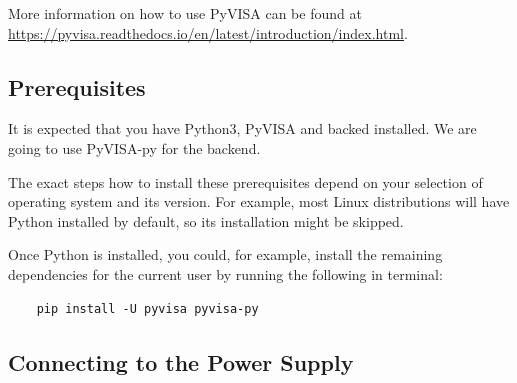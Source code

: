 \documentclass[a4paper,10pt]{article}
\begin{document}
More information on how to use PyVISA can be found at\newline
\href{https://pyvisa.readthedocs.io/en/latest/introduction/index.html}{https://pyvisa.readthedocs.io/en/latest/introduction/index.html}.

\subsection{Prerequisites}

It is expected that you have Python3, PyVISA and backed installed. We are going to use PyVISA-py for the backend.

The exact steps how to install these prerequisites depend on your selection of operating system and its version. For example, most Linux distributions will have Python installed by default, so its installation might be skipped.

Once Python is installed, you could, for example, install the remaining dependencies for the current user by running the following in terminal:
\begin{verbatim}
    pip install -U pyvisa pyvisa-py
\end{verbatim}

\subsection{Connecting to the Power Supply}
\end{document}
